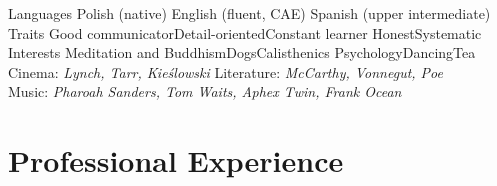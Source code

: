 \begin{sectionlist}
    \sectionlistitem
        {Languages}
        {
            Polish (native)\inlinesep
            English (fluent, CAE)\inlinesep
            Spanish (upper intermediate)
        }
    \sectionlistitem
        {Traits}
        {
            Good communicator\inlinesep Detail-oriented\inlinesep Constant learner\inlinesep
            Honest\inlinesep Systematic
        }
    \sectionlistitem
        {Interests}
        {
            Meditation and Buddhism\inlinesep Dogs\inlinesep Calisthenics\inlinesep
            Psychology\inlinesep Dancing\inlinesep Tea\inlinesep
            Cinema: \textit{Lynch, Tarr, Kieślowski}\inlinesep
            Literature: \textit{McCarthy, Vonnegut, Poe}\inlinesep\\
            Music: \textit{Pharoah Sanders, Tom Waits, Aphex Twin, Frank Ocean}
        }
\end{sectionlist}


\section{Professional Experience}

